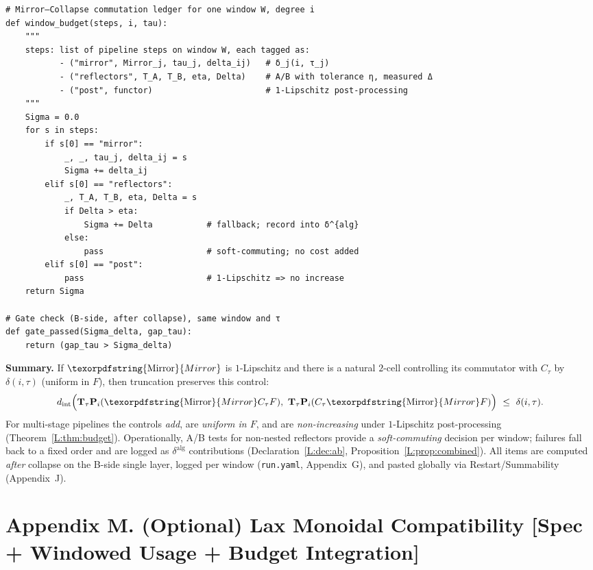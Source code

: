 \documentclass[11pt]{article}
\numberwithin{equation}{section}
\theoremstyle{plain}
\theoremstyle{definition}
\theoremstyle{remark}
\DeclareRobustCommand{\hyp}{\nobreakdash-}
\theoremstyle{plain}
\theoremstyle{definition}
\numberwithin{equation}{section}
\theoremstyle{definition}
\DeclareRobustCommand{\Mirror}{\texorpdfstring{\ensuremath{\operatorname{Mirror}}}{Mirror}}
\numberwithin{equation}{section}
\theoremstyle{plain}
\theoremstyle{definition}
\theoremstyle{remark}
\begin{document}
\begin{verbatim}
# Mirror–Collapse commutation ledger for one window W, degree i
def window_budget(steps, i, tau):
    """
    steps: list of pipeline steps on window W, each tagged as:
           - ("mirror", Mirror_j, tau_j, delta_ij)   # δ_j(i, τ_j)
           - ("reflectors", T_A, T_B, eta, Delta)    # A/B with tolerance η, measured Δ
           - ("post", functor)                       # 1-Lipschitz post-processing
    """
    Sigma = 0.0
    for s in steps:
        if s[0] == "mirror":
            _, _, tau_j, delta_ij = s
            Sigma += delta_ij
        elif s[0] == "reflectors":
            _, T_A, T_B, eta, Delta = s
            if Delta > eta:
                Sigma += Delta           # fallback; record into δ^{alg}
            else:
                pass                     # soft-commuting; no cost added
        elif s[0] == "post":
            pass                         # 1-Lipschitz => no increase
    return Sigma

# Gate check (B-side, after collapse), same window and τ
def gate_passed(Sigma_delta, gap_tau):
    return (gap_tau > Sigma_delta)
\end{verbatim}

\medskip
\noindent\textbf{Summary.}
If \(\Mirror\) is \(1\)\hyp Lipschitz and there is a natural \(2\)\hyp cell controlling its commutator with \(C_\tau\) by \(\delta(i,\tau)\) (uniform in \(F\)), then truncation preserves this control:
\[
d_{\mathrm{int}}\Big(\mathbf{T}_\tau\mathbf{P}_i(\Mirror C_\tau F),\ \mathbf{T}_\tau\mathbf{P}_i(C_\tau\Mirror F)\Big)\ \le\ \delta(i,\tau).
\]
For multi-stage pipelines the controls \emph{add}, are \emph{uniform in \(F\)}, and are \emph{non\hyp increasing} under \(1\)\hyp Lipschitz post\hyp processing (Theorem~\ref{L:thm:budget}).
Operationally, A/B tests for non\hyp nested reflectors provide a \emph{soft\hyp commuting} decision per window; failures fall back to a fixed order and are logged as \(\delta^{\mathrm{alg}}\) contributions (Declaration~\ref{L:dec:ab}, Proposition~\ref{L:prop:combined}).
All items are computed \emph{after} collapse on the B\hyp side single layer, logged per window (\texttt{run.yaml}, Appendix~G), and pasted globally via Restart/Summability (Appendix~J).



\section*{Appendix M. (Optional) Lax Monoidal Compatibility [Spec + Windowed Usage + Budget Integration]}
{}
\label{M:lax-monoidal}
\end{document}
